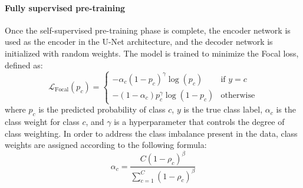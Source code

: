 


\paragraph{Fully supervised pre-training}

Once the self-supervised pre-training phase is complete, the encoder network is used as the encoder in the U-Net architecture, and the decoder network is initialized with random weights.
The model is trained to minimize the Focal loss, defined as:
\begin{equation}
    \mathcal{L}_{\text{Focal}}\left( p_c \right) = 
    \begin{cases}
        -\alpha_c \left(1 - p_c\right)^\gamma \log\left(p_c\right) & \text{if } y = c \\
        -\left(1 - \alpha_c\right) p_c^\gamma \log\left(1 - p_c\right) & \text{otherwise}
    \end{cases}
\end{equation}
where \(p_c\) is the predicted probability of class \(c\), \(y\) is the true class label, \(\alpha_c\) is the class weight for class \(c\), and \(\gamma\) is a hyperparameter that controls the degree of class weighting.
In order to address the class imbalance present in the data, class weights are assigned according to the following formula:
\begin{equation}
    \alpha_c = \frac{C \left(1 - \rho_c\right)^\beta}{\sum_{c=1}^{C} \left(1 - \rho_c\right)^\beta}
    \label{eq:class_weight}
\end{equation}
